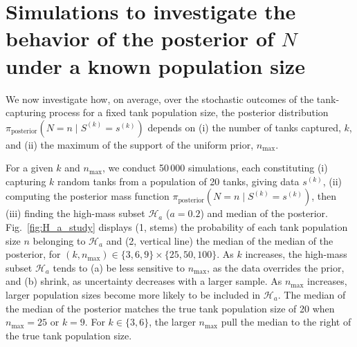 \documentclass[11pt, oneside]{article}
\begin{document}
\section{Simulations to investigate the behavior of the posterior of $N$ under a known population size}
\label{sec:sims}
We now investigate how, on average, over the stochastic outcomes of the tank-capturing process for a fixed tank population size, the posterior distribution $\pi_{\text{posterior}}(N=n \mid S^{(k)}=s^{(k)})$ depends on (i) the number of tanks captured, $k$, and (ii) the maximum of the support of the uniform prior, $n_{\text{max}}$.

For a given $k$ and $n_{\text{max}}$, we conduct 50\,000 simulations, each constituting (i) capturing $k$ random tanks from a population of 20 tanks, giving data $s^{(k)}$, (ii) computing the posterior mass function $\pi_{\text{posterior}}(N=n \mid S^{(k)}=s^{(k)})$, then (iii) finding the high-mass subset $\mathcal{H}_a$ ($a=0.2$) and median of the posterior. Fig.~\ref{fig:H_a_study} displays (1, stems) the probability of each tank population size $n$ belonging to $\mathcal{H}_a$ and (2, vertical line) the median of the median of the posterior, for $(k, n_{\text{max}})\in \{3, 6, 9\} \times \{25, 50, 100\}$.
As $k$ increases, the high-mass subset $\mathcal{H}_a$ tends to (a) be less sensitive to $n_{\text{max}}$, as the data overrides the prior, and (b) shrink, as uncertainty decreases with a larger sample. As $n_{\text{max}}$ increases, larger population sizes become more likely to be included in $\mathcal{H}_a$.
The median of the median of the posterior matches the true tank population size of 20 when $n_{\text{max}}=25$ or $k=9$. For $k\in\{3, 6\}$, the larger $n_{\text{max}}$ pull the median to the right of the true tank population size.
 
\end{document}
